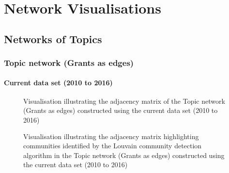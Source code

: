 \chapter{Network Visualisations}
\label{appendix:network_visualisations}

\section{Networks of Topics}

\subsection{Topic network (Grants as edges)}

\subsubsection{Current data set (2010 to 2016)}

\begin{figure}[htbp]
    \centering
    \caption[Visualisation illustrating the adjacency matrix of the Topic network (Grants as edges) constructed using the current data set (2010 to 2016)]{Visualisation illustrating the adjacency matrix of the Topic network (Grants as edges) constructed using the current data set (2010 to 2016)}
    \label{fig:topic_a_adjacency_matrix_appendix}
\end{figure}

\begin{figure}[htbp]
    \centering
    \caption[Visualisation illustrating the adjacency matrix highlighting communities in the Topic network (Grants as edges) constructed using the current data set (2010 to 2016)]{Visualisation illustrating the adjacency matrix highlighting communities identified by the Louvain community detection algorithm in the Topic network (Grants as edges) constructed using the current data set (2010 to 2016)}
    \label{fig:topic_a_adjacency_matrix_c_appendix}
\end{figure}

\begin{figure}[htbp]
    \centering
    \caption[]{}
    \label{fig:topic_a_adjacency_matrix_n_appendix}
\end{figure}

\begin{figure}[htbp]
    \centering
    \caption[]{}
    \label{fig:topic_a_adjacency_matrix_v_appendix}
\end{figure}